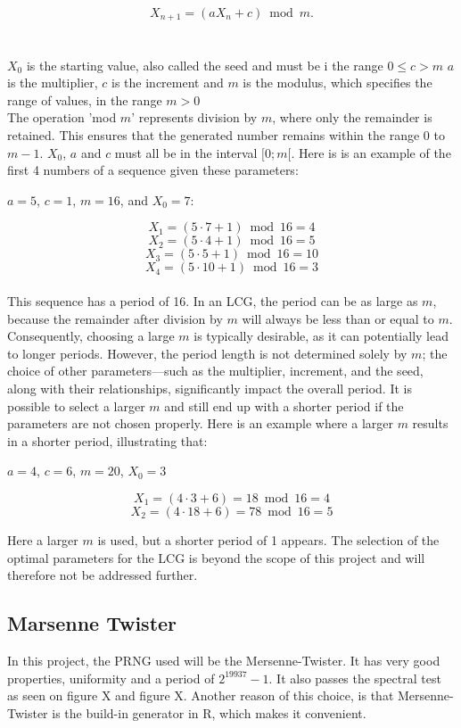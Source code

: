 $$X_{n+1} = (aX_n + c) \bmod m.$$  \\
\\
	\noindent $X_0$ is the starting value, also called the seed and must be i the range $0\leq c>m$ \newline
    $a$ is the multiplier,\newline 
    $c$ is the increment and \newline
    $m$ is the modulus, which specifies the range of values, in the range $m>0$ \newline
	\\
    \noindent The operation 'mod $m$' represents division by $m$, where only the remainder
is retained. This ensures that the generated number remains within the range
0 to $m-1$.  $X_0$, $a$ and $c$ must all be in the interval $[0; m[$. 
Here is is an example of the first 4 numbers of a sequence given these parameters: \newline
	
    \begin{center}
        $a = 5$, $c = 1$, $m = 16$, and $X_0 = 7$:
    \end{center}
    
		$$X_1 = (5 \cdot 7 + 1)\bmod 16 = 4 $$
		$$X_2 = (5 \cdot 4 + 1) \bmod 16 = 5 $$
		$$X_3 = (5 \cdot 5 + 1) \bmod 16 = 10 $$
		$$X_4 = (5 \cdot 10 + 1) \bmod 16 = 3 $$
\\
\noindent This sequence has a period of 16. In an LCG, the period can be as large as $m$,
because the remainder after division by $m$ will always be less than or equal to
$m$. Consequently, choosing a large $m$ is typically desirable, as it can potentially
lead to longer periods. However, the period length is not determined solely by
$m$; the choice of other parameters—such as the multiplier, increment, and the
seed, along with their relationships, significantly impact the overall period. It
is possible to select a larger $m$ and still end up with a shorter period if the parameters are not chosen properly. Here is an example where a larger $m$ results
in a shorter period, illustrating that:

\begin{center}
    $a=4$, $c=6$, $m=20$, $X_0=3$
\end{center}

$$X_1=(4 \cdot 3 +6)=18 \bmod 16=4$$ 
$$X_2=(4 \cdot 18+6)=78 \bmod 16=5$$

Here a larger $m$ is used, but a shorter period of 1 appears. The selection of the optimal parameters for the LCG is beyond the scope of this project and will therefore not be addressed further.

\subsection{Marsenne Twister}
In this project, the PRNG used will be the Mersenne-Twister. It has very good properties, uniformity and a period of $2^19937-1$. It also passes the spectral test as seen on figure X and figure X. Another reason of this choice, is that Mersenne-Twister is the build-in generator in R, which makes it convenient.